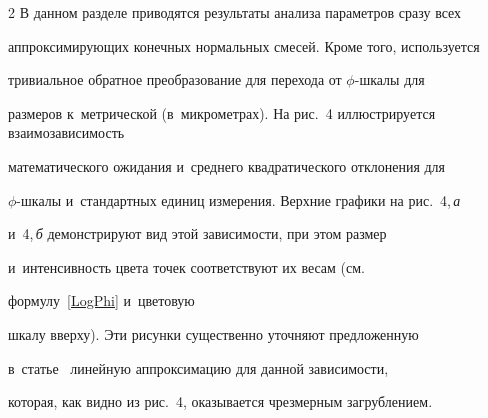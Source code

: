 \begin{multicols}{2}
В данном разделе приводятся результаты анализа параметров сразу всех 


аппроксимирующих конечных нормальных смесей. Кроме того, используется 


тривиальное обратное преобразование для перехода от $\phi$-шкалы для 


размеров к~метрической (в~микрометрах). На рис.~4 иллюстрируется взаимозависимость 


математического ожидания и~среднего квадратического отклонения для 


$\phi$-шкалы и~стандартных единиц измерения. Верхние графики на рис.~4,\,\textit{а} 


и~4,\,\textit{б} демонстрируют вид этой за\-ви\-си\-мости, при этом размер 


и~интенсивность цвета точек соответствуют их весам (см.\ 


формулу~\eqref{LogPhi} и~цветовую


шкалу вверху). Эти рисунки существенно уточняют предложенную 


в~статье~\cite{Slyuta2014} линейную аппроксимацию для данной за\-ви\-си\-мости, 


которая, как видно из рис.~4, оказывается чрезмерным загрублением.





\pagebreak





\end{multicols}





